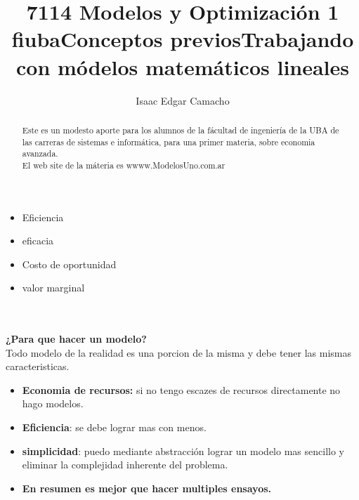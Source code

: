 \documentclass[a4paper,12pt]{article}
\title{7114 Modelos y Optimizaci\'on 1 fiuba}
\author{Isaac Edgar Camacho}
\begin{document}
\maketitle

\begin{abstract}

Este es un modesto aporte para los alumnos de la f\'acultad de ingenier\'ia  de la UBA de las carreras de sistemas e inform\'atica, para una primer materia, sobre economia avanzada.
\\
El web site de la m\'ateria es wwww.ModelosUno.com.ar

\end{abstract}

\title{\textbf{Conceptos previos}}
\begin{itemize}

\item Eficiencia
\item eficacia
\item Costo de oportunidad
\item valor marginal

\end{itemize}


\title{\textbf{Trabajando con m\'odelos matem\'aticos lineales}}
\\
\\
\textbf{¿Para que hacer un modelo?}
\\
Todo modelo de la realidad es una porcion de la misma y debe tener las mismas caracteristicas.
\begin{itemize}
\item \textbf{Economia de recursos:} si no tengo escazes de recursos directamente no hago modelos.
\item \textbf{Eficiencia}: se debe lograr mas con menos.
\item \textbf{simplicidad}: puedo mediante abstracci\'on lograr un modelo mas sencillo y eliminar la complejidad inherente del problema.
\item \textbf{En resumen es mejor que hacer multiples ensayos.}
\end{itemize}
\end{document}
